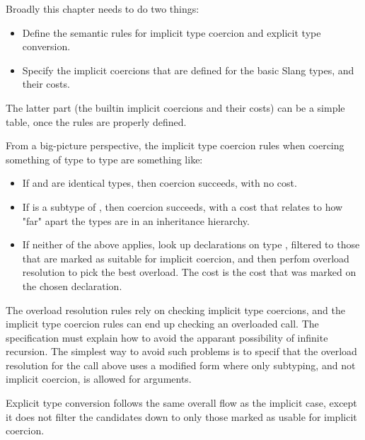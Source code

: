 
\begin{TODO}

Broadly this chapter needs to do two things:

\begin{itemize}
\item Define the semantic rules for implicit type coercion and explicit type conversion.
\item Specify the implicit coercions that are defined for the basic Slang types, and their costs.
\end{itemize}

The latter part (the builtin implicit coercions and their costs) can be a simple table, once the rules are properly defined.

From a big-picture perspective, the implicit type coercion rules when coercing something of type  to type  are something like:

\begin{itemize}
\item If  and  are identical types, then coercion succeeds, with no cost.
\item If  is a subtype of , then coercion succeeds, with a cost that relates to how "far" apart the types are in an inheritance hierarchy.
\item If neither of the above applies, look up  declarations on type , filtered to those that are marked as suitable for implicit coercion, and then perfom overload resolution to pick the best overload. The cost is the cost that was marked on the chosen  declaration.
\end{itemize}

The overload resolution rules rely on checking implicit type coercions, and the implicit type coercion rules can end up checking an overloaded  call.
The specification must explain how to avoid the apparant possibility of infinite recursion.
The simplest way to avoid such problems is to specif that the overload resolution for the  call above uses a modified form where only subtyping, and not implicit coercion, is allowed for arguments.

Explicit type conversion follows the same overall flow as the implicit case, except it does not filter the candidates down to only those marked as usable for implicit coercion.

\end{TODO}